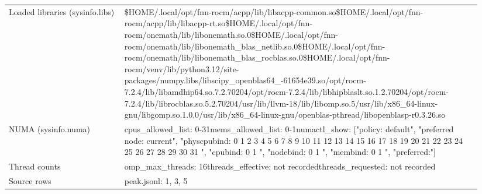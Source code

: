 \begin{longtable}{>{\raggedright\arraybackslash}p{0.23\linewidth}>{\raggedright\arraybackslash}p{0.71\linewidth}}
Loaded libraries (sysinfo.libs) & \$HOME/\allowbreak{}.local/\allowbreak{}opt/\allowbreak{}fnn-rocm/\allowbreak{}acpp/\allowbreak{}lib/\allowbreak{}libacpp-common.so\newline \$HOME/\allowbreak{}.local/\allowbreak{}opt/\allowbreak{}fnn-rocm/\allowbreak{}acpp/\allowbreak{}lib/\allowbreak{}libacpp-rt.so\newline \$HOME/\allowbreak{}.local/\allowbreak{}opt/\allowbreak{}fnn-rocm/\allowbreak{}onemath/\allowbreak{}lib/\allowbreak{}libonemath.so.0\newline \$HOME/\allowbreak{}.local/\allowbreak{}opt/\allowbreak{}fnn-rocm/\allowbreak{}onemath/\allowbreak{}lib/\allowbreak{}libonemath\_\allowbreak{}blas\_\allowbreak{}netlib.so.0\newline \$HOME/\allowbreak{}.local/\allowbreak{}opt/\allowbreak{}fnn-rocm/\allowbreak{}onemath/\allowbreak{}lib/\allowbreak{}libonemath\_\allowbreak{}blas\_\allowbreak{}rocblas.so.0\newline \$HOME/\allowbreak{}.local/\allowbreak{}opt/\allowbreak{}fnn-rocm/\allowbreak{}venv/\allowbreak{}lib/\allowbreak{}python3.12/\allowbreak{}site-packages/\allowbreak{}numpy.libs/\allowbreak{}libscipy\_\allowbreak{}openblas64\_\allowbreak{}-61654e39.so\newline /\allowbreak{}opt/\allowbreak{}rocm-7.2.4/\allowbreak{}lib/\allowbreak{}libamdhip64.so.7.2.70204\newline /\allowbreak{}opt/\allowbreak{}rocm-7.2.4/\allowbreak{}lib/\allowbreak{}libhipblaslt.so.1.2.70204\newline /\allowbreak{}opt/\allowbreak{}rocm-7.2.4/\allowbreak{}lib/\allowbreak{}librocblas.so.5.2.70204\newline /\allowbreak{}usr/\allowbreak{}lib/\allowbreak{}llvm-18/\allowbreak{}lib/\allowbreak{}libomp.so.5\newline /\allowbreak{}usr/\allowbreak{}lib/\allowbreak{}x86\_\allowbreak{}64-linux-gnu/\allowbreak{}libgomp.so.1.0.0\newline /\allowbreak{}usr/\allowbreak{}lib/\allowbreak{}x86\_\allowbreak{}64-linux-gnu/\allowbreak{}openblas-pthread/\allowbreak{}libopenblasp-r0.3.26.so \\
NUMA (sysinfo.numa) & cpus\_\allowbreak{}allowed\_\allowbreak{}list: 0-31\newline mems\_\allowbreak{}allowed\_\allowbreak{}list: 0-1\newline numactl\_\allowbreak{}show: ["policy: default", "preferred node: current", "physcpubind: 0 1 2 3 4 5 6 7 8 9 10 11 12 13 14 15 16 17 18 19 20 21 22 23 24 25 26 27 28 29 30 31 ", "cpubind: 0 1 ", "nodebind: 0 1 ", "membind: 0 1 ", "preferred:"] \\
Thread counts & omp\_\allowbreak{}max\_\allowbreak{}threads: 16\newline threads\_\allowbreak{}effective: not recorded\newline threads\_\allowbreak{}requested: not recorded \\
Source rows & peak.jsonl: 1, 3, 5 \\
\end{longtable}
